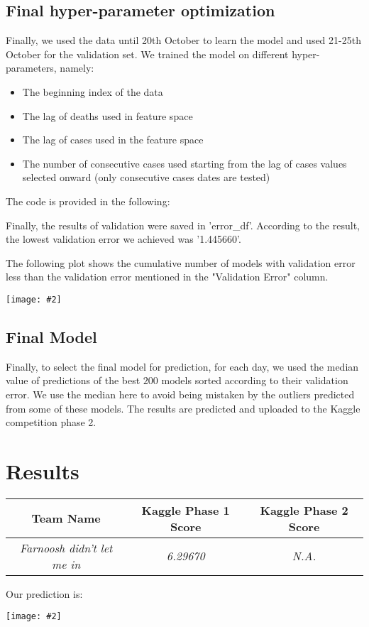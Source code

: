 \documentclass{article}
\newcommand{\centerfig}[2]{\begin{center}\texttt{[image: \#2]}\end{center}}
\begin{document}
\subsection{Final hyper-parameter optimization}

Finally, we used the data until 20th October to learn the model and used 21-25th October for the validation set. We trained the model on different hyper-parameters, namely:

\begin{itemize}
\item The beginning index of the data
\item The lag of deaths used in feature space
\item The lag of cases used in the feature space
\item The number of consecutive cases used starting from the lag of cases values selected onward (only consecutive cases dates are tested)
\end{itemize}

The code is provided in the following:



Finally, the results of validation were saved in 'error\_df'. According to the result, the lowest validation error we achieved was '1.445660'. 

The following plot shows the cumulative number of models with validation error less than the validation error mentioned in the "Validation Error" column.

\centerfig{.8}{./Images/11}

\subsection{Final Model}

Finally, to select the final model for prediction, for each day, we used the median value of predictions of the best $200$ models sorted according to their validation error. We use the median here to avoid being mistaken by the outliers predicted from some of these models. The results are predicted and uploaded to the Kaggle competition phase 2.

\section{Results}

\begin{center}
 \begin{tabular}{|c | c | c |} 
 \hline
 Team Name & Kaggle Phase 1 Score & Kaggle Phase 2 Score  \\ [0.5ex]
 \hline\hline
 \emph{Farnoosh didn't let me in} & \emph{6.29670}  & \emph{N.A.}  \\
 \hline
\end{tabular}

Our prediction is:

\centerfig{.8}{./Images/12}

\end{center}
\end{document}
